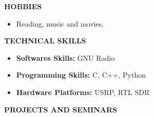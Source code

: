 \documentclass[a4paper,10pt]{article}
\begin{document}
 \colorbox{titleColor}{\parbox{6.5in}{\textbf{HOBBIES}}}

  \begin{itemize}
 \setlength{\itemsep}{1pt}
    \item Reading, music and movies.
  \end{itemize}
  
 \colorbox{titleColor}{\parbox{6.5in}{\textbf{TECHNICAL SKILLS}}}
 
 \begin{itemize}
 \setlength{\itemsep}{1pt}
  \item \textbf{{Softwares Skills:}} GNU Radio
 \item \textbf{{Programming Skills:}} C, C++, Python
 \item \textbf{{Hardware Platforms:}} USRP, RTL SDR
 \end{itemize}
 
 \colorbox{titleColor}{\parbox{6.5in}{\textbf{PROJECTS AND SEMINARS}}}
\end{document}
